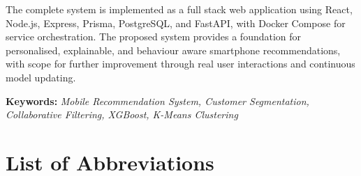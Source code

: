 \documentclass[12pt]{report}
\numberwithin{figure}{chapter}
\numberwithin{table}{chapter}
\numberwithin{equation}{chapter}
\begin{document}
The complete system is implemented as a full stack web application using React, Node.js, Express, Prisma, PostgreSQL, and FastAPI, with Docker Compose for service orchestration. The proposed system provides a foundation for personalised, explainable, and behaviour aware smartphone recommendations, with scope for further improvement through real user interactions and continuous model updating.

\textbf{Keywords:} \textit{Mobile Recommendation System, Customer Segmentation, Collaborative Filtering, XGBoost, K-Means Clustering}


\tableofcontents
{}
\listoffigures
{}
\listoftables
{}
\chapter*{List of Abbreviations}
\end{document}
